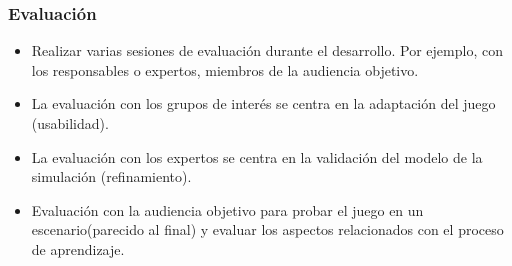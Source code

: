 \subsubsection{Evaluación} 
\begin{itemize}
	\item Realizar varias sesiones de evaluación durante el desarrollo. Por ejemplo, con los responsables o expertos, miembros de la audiencia objetivo. 
	\item La evaluación con los grupos de interés se centra en la adaptación del juego (usabilidad). 
	\item La evaluación con los expertos se centra en la validación del modelo de la simulación (refinamiento). 
	\item Evaluación con la audiencia objetivo para probar el juego en un escenario(parecido al final) y evaluar los aspectos relacionados con el proceso de aprendizaje.
\end{itemize}


